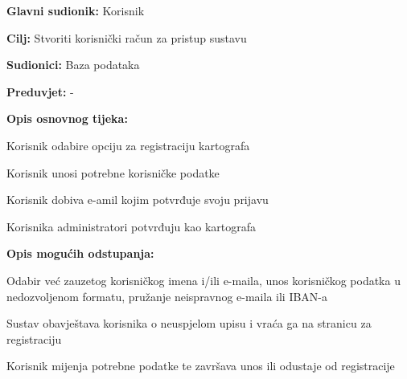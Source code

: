 					\noindent {}
					\begin{packed_item}
	
						\item \textbf{Glavni sudionik: }Korisnik
						\item  \textbf{Cilj:} Stvoriti korisnički račun za pristup sustavu
						\item  \textbf{Sudionici:} Baza podataka
						\item  \textbf{Preduvjet:} -
						\item  \textbf{Opis osnovnog tijeka:}
						
						\item[] \begin{packed_enum}
	
							\item Korisnik odabire opciju za registraciju kartografa
							\item Korisnik unosi potrebne korisničke podatke
							\item Korisnik dobiva e-amil kojim potvrđuje svoju prijavu
							\item Korisnika administratori potvrđuju kao kartografa

						\end{packed_enum}
						
						\item  \textbf{Opis mogućih odstupanja:}
						
						\item[] \begin{packed_item}
	
							\item[2.a] Odabir već zauzetog korisničkog imena i/ili e-maila, unos korisničkog podatka u nedozvoljenom formatu, pružanje neispravnog e-maila ili IBAN-a
							\item[] \begin{packed_enum}
								
								\item Sustav obavještava korisnika o neuspjelom upisu i vraća ga na stranicu za registraciju
								\item Korisnik mijenja potrebne podatke te završava unos ili odustaje od registracije
								
							\end{packed_enum}
							
						\end{packed_item}
					\end{packed_item}
				
